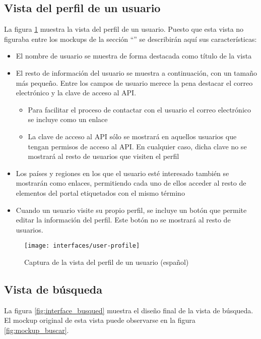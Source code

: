 \subsection{Vista del perfil de un usuario}
La figura \ref{fig:interface_perfil_usuario} muestra la vista del perfil de un usuario.  Puesto que esta vista no figuraba entre los mockups de la sección ``'' se describirán aquí sus características:
\begin{itemize}
	\item El nombre de usuario se muestra de forma destacada como título de la vista
	\item El resto de información del usuario se muestra a continuación, con un tamaño más pequeño.  Entre los campos de usuario merece la pena destacar el correo electrónico y la clave de acceso al API.
	\begin{itemize}
		\item Para facilitar el proceso de contactar con el usuario el correo electrónico se incluye como un enlace
		\item La clave de acceso al API sólo se mostrará en aquellos usuarios que tengan permisos de acceso al API.  En cualquier caso, dicha clave no se mostrará al resto de usuarios que visiten el perfil
	\end{itemize}
	\item Los países y regiones en los que el usuario esté interesado también se mostrarán como enlaces, permitiendo cada uno de ellos acceder al resto de elementos del portal etiquetados con el mismo término
	\item Cuando un usuario visite su propio perfil, se incluye un botón que permite editar la información del perfil.  Este botón no se mostrará al resto de usuarios.
\end{itemize}
\begin{figure}[h]
	\centering
	\texttt{[image: interfaces/user-profile]}
	\caption{Captura de la vista del perfil de un usuario (español)}
	\label{fig:interface_perfil_usuario}
\end{figure}


\subsection{Vista de búsqueda}
La figura \ref{fig:interface_busqued} muestra el diseño final de la vista de búsqueda.  El mockup original de esta vista puede observarse en la figura \ref{fig:mockup_buscar}.

